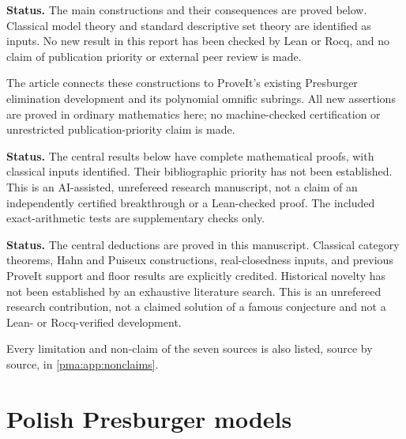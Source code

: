 \documentclass[11pt]{article}
\numberwithin{equation}{section}
\theoremstyle{definition}
\theoremstyle{remark}
\begin{document}
\begin{tcolorbox}[title=Source 07: status]

\textbf{Status.} The main constructions and their consequences are proved
below. Classical model theory and standard descriptive set theory are
identified as inputs. No new result in this report has been checked by Lean
or Rocq, and no claim of publication priority or external peer review is
made.

\end{tcolorbox}
\begin{tcolorbox}[title=Source 06: from its abstract]

The article connects these constructions to ProveIt's existing Presburger
elimination development and its polynomial omnific subrings. All new
assertions are proved in ordinary mathematics here; no machine-checked
certification or unrestricted publication-priority claim is made.

\end{tcolorbox}
\begin{tcolorbox}[title=Source 08: status]

\textbf{Status.} The central results below have complete mathematical proofs,
with classical inputs identified. Their bibliographic priority has not been
established. This is an AI-assisted, unrefereed research manuscript, not a
claim of an independently certified breakthrough or a Lean-checked proof.
The included exact-arithmetic tests are supplementary checks only.

\end{tcolorbox}
\begin{tcolorbox}[title=Source 09: status]

\textbf{Status.} The central deductions are proved in this manuscript.
Classical category theorems, Hahn and Puiseux constructions, real-closedness
inputs, and previous ProveIt support and floor results are explicitly credited.
Historical novelty has not been established by an exhaustive literature search.
This is an unrefereed research contribution, not a claimed solution of a famous
conjecture and not a Lean- or Rocq-verified development.

\end{tcolorbox}

\noindent
Every limitation and non-claim of the seven sources is also listed, source by
source, in \cref{pma:app:nonclaims}.

\part{Polish Presburger models}\label{pma:part:pr}
\end{document}
